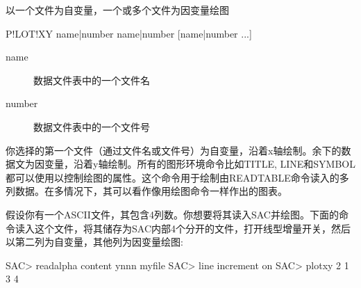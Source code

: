 \label{cmd:plotxy}

以一个文件为自变量，一个或多个文件为因变量绘图

\begin{SACSTX}
P!LOT!XY name|number name|number [name|number ...]
\end{SACSTX}

\begin{description}
\item [name] 数据文件表中的一个文件名 
\item [number] 数据文件表中的一个文件号 
\end{description}

你选择的第一个文件（通过文件名或文件号）为自变量，沿着x轴绘制。余下的数据文为因变量，沿着y轴绘制。所有的图形环境命令比如TITLE, LINE和SYMBOL都可以使用以控制绘图的属性。这个命令用于绘制由READTABLE命令读入的多列数据。在多情况下，其可以看作像用绘图命令一样作出的图表。

假设你有一个ASCII文件，其包含4列数。你想要将其读入SAC并绘图。下面的命令读入这个文件，将其储存为SAC内部4个分开的文件，打开线型增量开关，然后以第二列为自变量，其他列为因变量绘图:
\begin{SACCode}
SAC> readalpha content ynnn myfile
SAC> line increment on
SAC> plotxy 2 1 3 4
\end{SACCode}
